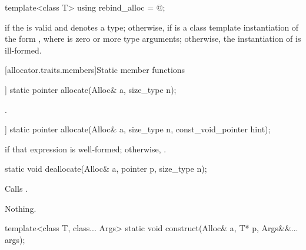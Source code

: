%
\begin{itemdecl}
template<class T> using rebind_alloc = @\seebelow@;
\end{itemdecl}

\begin{itemdescr}
\pnum
\templalias {} if
the   is valid and denotes a
type; otherwise,
 if  is a class template instantiation
of the form , where  is zero or more type arguments;
otherwise, the instantiation of  is ill-formed.
\end{itemdescr}

[allocator.traits.members]{Static member functions}

%
\begin{itemdecl}
[[nodiscard]] static pointer allocate(Alloc& a, size_type n);
\end{itemdecl}

\begin{itemdescr}
\pnum
\returns {}.
\end{itemdescr}

%
\begin{itemdecl}
[[nodiscard]] static pointer allocate(Alloc& a, size_type n, const_void_pointer hint);
\end{itemdecl}

\begin{itemdescr}
\pnum
\returns {} if that expression is well-formed; otherwise, .
\end{itemdescr}

%
\begin{itemdecl}
static void deallocate(Alloc& a, pointer p, size_type n);
\end{itemdecl}

\begin{itemdescr}
\pnum
\effects Calls .

\pnum
\throws Nothing.
\end{itemdescr}

%
\begin{itemdecl}
template<class T, class... Args>
  static void construct(Alloc& a, T* p, Args&&... args);
\end{itemdecl}

